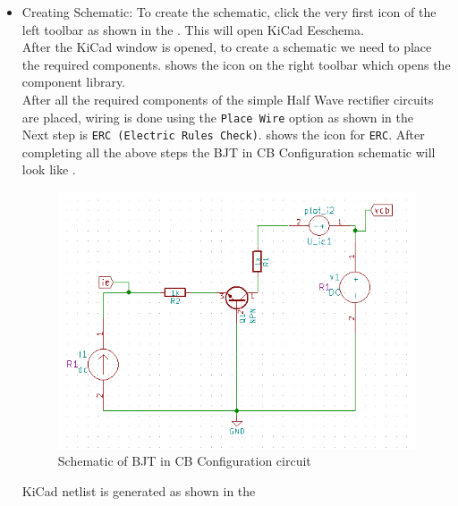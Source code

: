 \begin{itemize}
\item Creating Schematic:
To create the schematic, click the very first icon of the left toolbar as shown in the . This will open KiCad Eeschema.\\

After the KiCad window is opened, to create a schematic we need to place the required components.  shows the icon on the 
right toolbar which opens the component library.\\

After all the required components of the simple Half Wave rectifier circuits are placed, wiring is done using the {\tt Place Wire} option as shown in the \\

Next step is {\tt ERC (Electric Rules Check)}.  shows the icon for {\tt ERC}. After completing all the above steps the BJT in CB Configuration schematic will look like .\\

\begin{figure}[!htp]
    \centering
    \includegraphics[width=\lgfig]{figures/cb_schematic.png}
    \caption{Schematic of BJT in CB Configuration circuit}
    \label{cb_schematic}
\end{figure}

\pagebreak

KiCad netlist is generated as shown in the  \\


\end{itemize}
